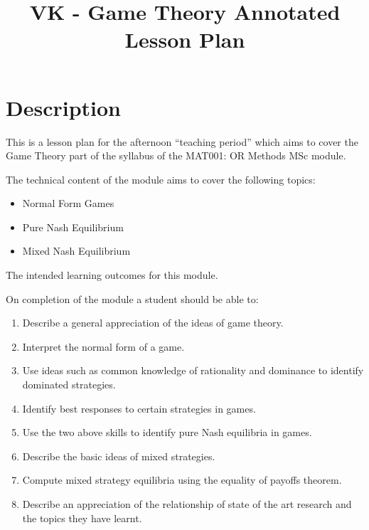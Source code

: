\documentclass[12pt]{article}
\title{VK - Game Theory Annotated Lesson Plan}
\date{}
\begin{document}
\maketitle

\section{Description}

This is a lesson plan for the afternoon ``teaching period'' which aims to cover the Game Theory part of the syllabus of the MAT001: OR Methods MSc module.

The technical content of the module aims to cover the following topics:

\begin{itemize}
\item Normal Form Games
\item Pure Nash Equilibrium
\item Mixed Nash Equilibrium
\end{itemize}

The intended learning outcomes for this module.

On completion of the module a student should be able to:

\begin{enumerate}[label=\Alph*]
\item Describe a general appreciation of the ideas of game theory.
\item Interpret the normal form of a game.
\item Use ideas such as common knowledge of rationality and dominance to identify dominated strategies.
\item Identify best responses to certain strategies in games.
\item Use the two above skills to identify pure Nash equilibria in games.
\item Describe the basic ideas of mixed strategies.
\item Compute mixed strategy equilibria using the equality of payoffs theorem.
\item Describe an appreciation of the relationship of state of the art research and the topics they have learnt.
\end{enumerate}
\end{document}
